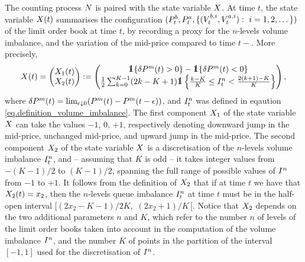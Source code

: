 \documentclass[10pt]{article}
\begin{document}
The counting process $\multiCountingProc$ is paired with the state variable $\stateVariable$. At time $t$, the state variable $\stateVariable(t)$ summarises the configuration $(\bestBidPrice_t,\bestAskPrice_t,\lbrace( \nthBestBidVolume[i]_t, \nthBestAskVolume[i]_t): \, \, i=1,2,\dots \rbrace)$ of the limit order book at time $t$, by recording a proxy for the $n$-levels volume imbalance, and the variation of the mid-price compared to time $t-$. More precisely, 
\begin{equation*}
 \stateVariable(t)
 =
 \begin{pmatrix}
 \stateVariable_1 (t)
 \\
 \stateVariable_2(t)
 \end{pmatrix}
 :=
 \begin{pmatrix}
 \one\lbrace\delta\midprice(t)>0\rbrace - \one\lbrace\delta\midprice(t)<0\rbrace
 \\
 \half\sum_{k=0}^{K-1} (2k-K+1 )\one\left\lbrace \frac{k-K}{K} \leq \volumeImbalance^n_t < \frac{2(k+1)-K}{K} \right\rbrace
 \end{pmatrix},
\end{equation*}
where $\delta\midprice(t) = \lim_{\epsilon\downarrow 0} (\midprice(t) - \midprice(t-\epsilon) )$, and $\volumeImbalance^{n}_t$ was defined in eqaution \eqref{eq.definition_volume_imbalance}. The first component $\stateVariable_1$ of the state variable $\stateVariable$ can take the values $-1$, $0$, $+1$, respectively denoting downward jump in the mid-price, unchanged mid-price, and upward jump in the mid-price. The second component $\stateVariable_2$ of the state variable $\stateVariable$ is a discretisation of the $n$-levels volume imbalance $\volumeImbalance^{n}_t$, and -- assuming that $K$ is odd -- it takes integer values from $-(K-1)/2$ to $(K-1)/2$, spanning the full range of possible values of $\volumeImbalance^n$ from $-1$ to $+1$. 
It follows from the definition of $\stateVariable_2$ that if at time $t$ we have that $\stateVariable_2 (t) = x_2$, then the $n$-levels queue imbalance $\volumeImbalance^n_t$ at time $t$ must be in the half-open interval $[(2x_2 -K -1)/2K, \, \, (2x_2 +1)/K \, [$.
Notice that $\stateVariable_2$ depends on the two additional parameters $n$ and $K$, which refer to the number $n$ of levels of the limit order books taken into account in the computation of the volume imbalance $\volumeImbalance^n$, and the number $K$ of points in the partition of the interval $[-1,1]$  used for the discretisation of $\volumeImbalance^n$. 
\end{document}
